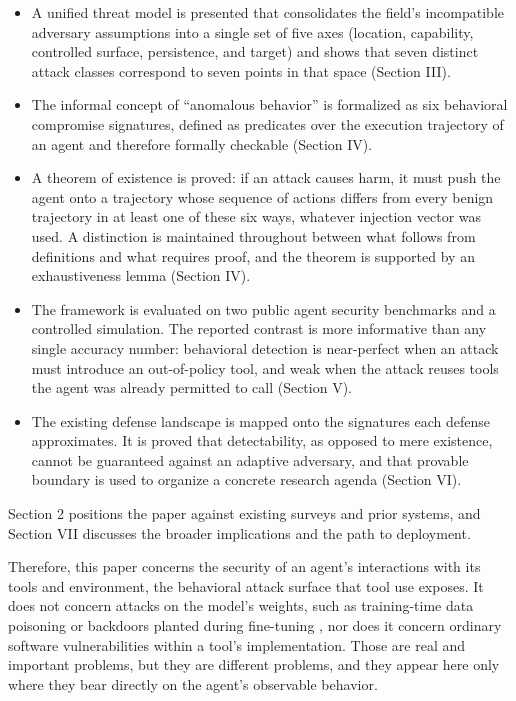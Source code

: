 \documentclass[journal]{IEEEtran}
\theoremstyle{remark}
\begin{document}
\begin{itemize}
\item A unified threat model is presented that consolidates the field's incompatible adversary assumptions into a single set of five axes (location, capability, controlled surface, persistence, and target) and shows that seven distinct attack classes correspond to seven points in that space (Section III).
\item The informal concept of ``anomalous behavior'' is formalized as six behavioral compromise signatures, defined as predicates over the execution trajectory of an agent and therefore formally checkable (Section IV).
\item A theorem of existence is proved: if an attack causes harm, it must push the agent onto a trajectory whose sequence of actions differs from every benign trajectory in at least one of these six ways, whatever injection vector was used. A distinction is maintained throughout between what follows from definitions and what requires proof, and the theorem is supported by an exhaustiveness lemma (Section IV).
\item The framework is evaluated on two public agent security benchmarks and a controlled simulation. The reported contrast is more informative than any single accuracy number: behavioral detection is near-perfect when an attack must introduce an out-of-policy tool, and weak when the attack reuses tools the agent was already permitted to call (Section V).
\item The existing defense landscape is mapped onto the signatures each defense approximates. It is proved that detectability, as opposed to mere existence, cannot be guaranteed against an adaptive adversary, and that provable boundary is used to organize a concrete research agenda (Section VI).
\end{itemize}

Section 2 positions the paper against existing surveys and prior systems, and Section VII discusses the broader implications and the path to deployment.

Therefore, this paper concerns the security of an agent's interactions with its tools and environment, the behavioral attack surface that tool use exposes. It does not concern attacks on the model's weights, such as training-time data poisoning or backdoors planted during fine-tuning \cite{r29}, nor does it concern ordinary software vulnerabilities within a tool's implementation. Those are real and important problems, but they are different problems, and they appear here only where they bear directly on the agent's observable behavior.
\end{document}
